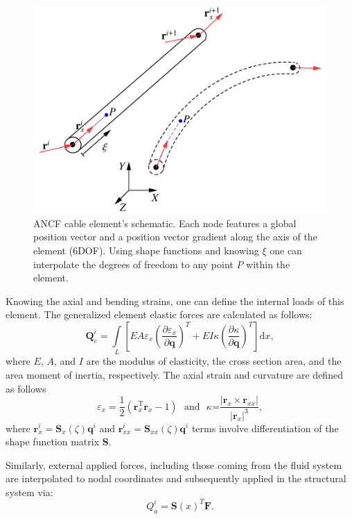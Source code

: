 \begin{figure}[!t]
	\begin{center}
		\includegraphics[width=.6\linewidth]{images/ANCF_1D.png}
	\end{center}
	\caption{ANCF cable element's schematic. Each node features a global position vector and a position vector gradient along the axis of the element (6DOF). Using shape functions and knowing $\xi$ one can interpolate the degrees of freedom to any point $P$ within the element. } \label{fig:ANCFCable}
\end{figure}


Knowing the axial and bending strains, one can define the internal loads of this element. 
The generalized element elastic forces are calculated as follows:
\begin{equation} \label{eq:ANCF_Beam_Qe}
\mathbf{Q}^i_{e}=\int\limits_{L}{\left[ EA \varepsilon_{x} ({\frac{{\partial \varepsilon }_{x}}{\partial \mathbf{q}}})^T+EI\kappa ({\frac{\partial \kappa}{\partial \mathbf{q}}})^T  \right]}\text{d}x,
\end{equation}
where $E$, $A$, and $I$ are the modulus of elasticity, the cross section area, and the area moment of inertia, respectively. The axial strain and curvature are defined as follows
\begin{equation*} \label{eq:ANCF_Beam_ex_k}
{{\varepsilon }_{x}}=\frac{1}{2}\left( \bm{r}_{x}^{\text{T}}\bm{r}_{x}^{{}}-1 \right) \text{  } \text{and} \text{  } \kappa \text{=}\frac{\left| {{\bm{r}}_{x}}\times {{\bm{r}}_{xx}} \right|}{{{\left| {{\bm{r}}_{x}} \right|}^{3}}},
\end{equation*}
where $\bm{r}^i_{x}=\bm{S}_x(\zeta) \bm{q}^i$ and $\bm{r}^i_{xx}=\bm{S}_{xx}(\zeta) \bm{q}^i$ terms involve differentiation of the shape function matrix $\bm S$.

Similarly, external applied forces, including those coming from the fluid system are interpolated to nodal coordinates and subsequently applied in the structural system via:
\begin{equation} \label{eq:ANCF_Beam_Qa}
Q^i_a = \bm S(x)^T \bm F.
\end{equation}

